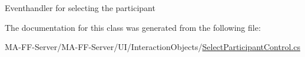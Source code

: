 Eventhandler for selecting the participant 



The documentation for this class was generated from the following file\+:\begin{DoxyCompactItemize}
\item 
M\+A-\/\+F\+F-\/\+Server/\+M\+A-\/\+F\+F-\/\+Server/\+U\+I/\+Interaction\+Objects/\hyperlink{_select_participant_control_8cs}{Select\+Participant\+Control.\+cs}\end{DoxyCompactItemize}
